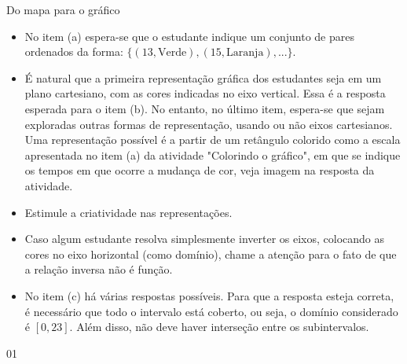 \begin{sugestions}{Do mapa para o gráfico}
{
\begin{itemize}
\item No item (a) espera-se que o estudante indique um conjunto de pares ordenados da forma: $\{(13, \text{Verde}),(15, \text{Laranja}),...\}$.

\item É natural que a primeira representação gráfica dos estudantes seja em um plano cartesiano, com as cores indicadas no eixo vertical. Essa é a resposta esperada para o item (b). No entanto, no último item, espera-se que sejam exploradas outras formas de representação, usando ou não eixos cartesianos. Uma representação possível é a partir de um retângulo colorido como a escala apresentada no item (a) da atividade "Colorindo o gráfico", em que se indique os tempos em que ocorre a mudança de cor, veja imagem na resposta da atividade.

\item Estimule a criatividade nas representações.

\item Caso algum estudante resolva simplesmente inverter os eixos, colocando as cores no eixo horizontal (como domínio), chame a atenção para o fato de que a relação inversa não é função.

\item No item (c) há várias respostas possíveis. Para que a resposta esteja correta, é necessário que todo o intervalo está coberto, ou seja, o domínio considerado é $[0,23]$. Além disso, não deve haver interseção entre os subintervalos.
\end{itemize}
}{0}{1}
\end{sugestions}
